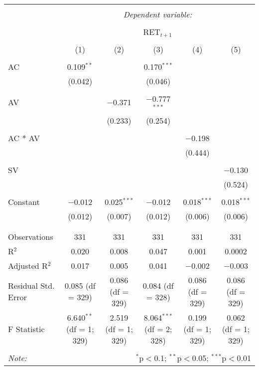 
\begin{table}[!htbp] \centering 
  \caption{} 
  \label{} 
\begin{tabular}{@{\extracolsep{5pt}}lccccc} 
\\[-1.8ex]\hline 
\hline \\[-1.8ex] 
 & \multicolumn{5}{c}{\textit{Dependent variable:}} \\ 
\cline{2-6} 
\\[-1.8ex] & \multicolumn{5}{c}{RET$_{t+1}$} \\ 
\\[-1.8ex] & (1) & (2) & (3) & (4) & (5)\\ 
\hline \\[-1.8ex] 
 AC & 0.109$^{**}$ &  & 0.170$^{***}$ &  &  \\ 
  & (0.042) &  & (0.046) &  &  \\ 
  & & & & & \\ 
 AV &  & $-$0.371 & $-$0.777$^{***}$ &  &  \\ 
  &  & (0.233) & (0.254) &  &  \\ 
  & & & & & \\ 
 AC * AV &  &  &  & $-$0.198 &  \\ 
  &  &  &  & (0.444) &  \\ 
  & & & & & \\ 
 SV &  &  &  &  & $-$0.130 \\ 
  &  &  &  &  & (0.524) \\ 
  & & & & & \\ 
 Constant & $-$0.012 & 0.025$^{***}$ & $-$0.012 & 0.018$^{***}$ & 0.018$^{***}$ \\ 
  & (0.012) & (0.007) & (0.012) & (0.006) & (0.006) \\ 
  & & & & & \\ 
\hline \\[-1.8ex] 
Observations & 331 & 331 & 331 & 331 & 331 \\ 
R$^{2}$ & 0.020 & 0.008 & 0.047 & 0.001 & 0.0002 \\ 
Adjusted R$^{2}$ & 0.017 & 0.005 & 0.041 & $-$0.002 & $-$0.003 \\ 
Residual Std. Error & 0.085 (df = 329) & 0.086 (df = 329) & 0.084 (df = 328) & 0.086 (df = 329) & 0.086 (df = 329) \\ 
F Statistic & 6.640$^{**}$ (df = 1; 329) & 2.519 (df = 1; 329) & 8.064$^{***}$ (df = 2; 328) & 0.199 (df = 1; 329) & 0.062 (df = 1; 329) \\ 
\hline 
\hline \\[-1.8ex] 
\textit{Note:}  & \multicolumn{5}{r}{$^{*}$p$<$0.1; $^{**}$p$<$0.05; $^{***}$p$<$0.01} \\ 
\end{tabular} 
\end{table} 
